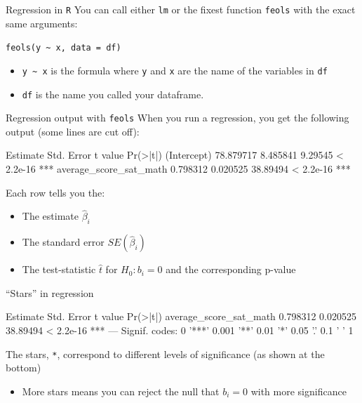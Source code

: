 \documentclass[aspectratio=169,t,11pt,table]{beamer}
\begin{document}
\begin{frame}{Regression in \texttt{R}}
  You can call either \texttt{lm} or the fixest function \texttt{feols} with the exact same arguments:
  
  \texttt{feols(y \textasciitilde{} x, data = df)}
  \begin{itemize}
    \item \texttt{y \textasciitilde{} x} is the formula where \texttt{y} and \texttt{x} are the name of the variables in \texttt{df}
    \item \texttt{df} is the name you called your dataframe.
  \end{itemize}
\end{frame}

\begin{frame}[fragile]{Regression output with \texttt{feols}}
  When you run a regression, you get the following output (some lines are cut off): 

  \begin{codeblock}[{}]
                        Estimate Std. Error  t value  Pr(>|t|)
(Intercept)            78.879717   8.485841  9.29545 < 2.2e-16 ***
average_score_sat_math  0.798312   0.020525 38.89494 < 2.2e-16 ***
  \end{codeblock}

  \pause
  Each row tells you the:
  \begin{itemize}
    \item The estimate $\hat{\beta}_i$
    \item The standard error $SE(\hat{\beta}_i)$
    \item The test-statistic $\hat{t}$ for $H_0: b_i = 0$ and the corresponding p-value
  \end{itemize} 
\end{frame}

\begin{frame}[fragile]{``Stars'' in regression}
  \vspace*{-\bigskipamount}
  \begin{codeblock}[{}]
                        Estimate Std. Error  t value  Pr(>|t|)
average_score_sat_math  0.798312   0.020525 38.89494 < 2.2e-16 ***
---
Signif. codes:  0 '***' 0.001 '**' 0.01 '*' 0.05 '.' 0.1 ' ' 1
  \end{codeblock}

  \bigskip
  The stars, \texttt{*}, correspond to different levels of significance (as shown at the bottom)
  \begin{itemize}
    \item More stars means you can reject the null that $b_i = 0$ with more significance
  \end{itemize}
\end{frame}
\end{document}
